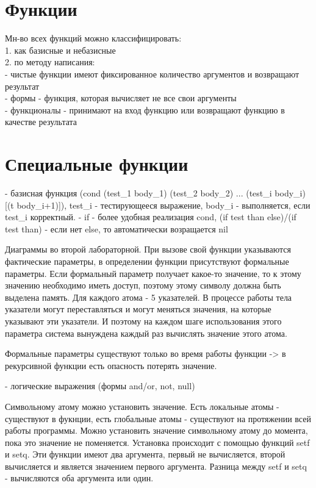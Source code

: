 \section{Функции}
Мн-во всех функций можно классифицировать:\\
1. как базисные и небазисные\\
2. по методу написания:\\
    - чистые функции имеют фиксированное количество аргументов и возвращают результат\\
    - формы - функция, которая вычисляет не все свои аргументы\\
    - функционалы - принимают на вход функцию или возвращают функцию в качестве результата\\

\section{Специальные функции}
- базисная функция (cond (test\_1 body\_1) (test\_2 body\_2) ... (test\_i body\_i) [(t body\_i+1)]), test\_i - тестирующееся выражение, body\_i - выполняется, если test\_i корректный.
- if - более удобная реализация cond, (if test than else)/(if test than) - если нет else, то автоматически возращается nil

Диаграммы во второй лабораторной.
При вызове свой функции указываются фактические параметры, в определении функции присутствуют формальные параметры. Если формальный параметр получает какое-то значение, то к этому значению необходимо иметь доступ, поэтому этому символу должна быть выделена память. Для каждого атома - 5 указателей. В процессе работы тела указатели могут переставляться и могут меняться значения, на которые указывают эти указатели. И поэтому на каждом шаге использования этого параметра система вынуждена каждый раз вычислять значение этого атома.

Формальные параметры существуют только во время работы функции -> в рекурсивной функции есть опасность потерять значение.

- логические выражения (формы and/or, not, null)

Символьному атому можно установить значение. Есть локальные атомы - существуют в фукнции, есть глобальные атомы - существуют на протяжении всей работы программы. Можно установить значение символьному атому до момента, пока это значение не поменяется. Установка происходит с помощью функций setf и setq. Эти функции имеют два аргумента, первый не вычисляется, второй вычисляется и является значением первого аргумента. Разница между setf и setq - вычисляются оба аргумента или один. 

